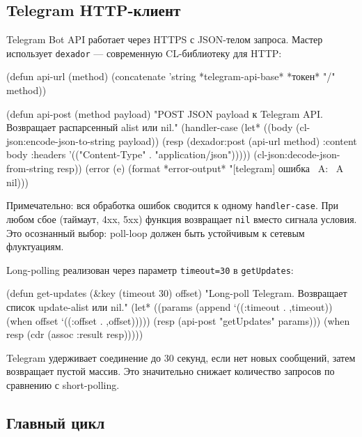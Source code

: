 \documentclass[11pt,a4paper]{article}
\begin{document}
\subsection{Telegram HTTP-клиент}

Telegram Bot API работает через HTTPS с JSON-телом запроса. Мастер использует \texttt{dexador} — современную CL-библиотеку для HTTP:

\begin{lispcode}[caption={мастер/cl/telegram.lisp — ядро HTTP-клиента}]
(defun api-url (method)
  (concatenate 'string *telegram-api-base* *токен* "/" method))

(defun api-post (method payload)
  "POST JSON payload к Telegram API.
  Возвращает распарсенный alist или nil."
  (handler-case
      (let* ((body (cl-json:encode-json-to-string payload))
             (resp (dexador:post (api-url method)
                                 :content body
                                 :headers '(("Content-Type"
                                             . "application/json")))))
        (cl-json:decode-json-from-string resp))
    (error (e)
      (format *error-output* "[telegram] ошибка ~A: ~A~%
      nil)))
\end{lispcode}

Примечательно: вся обработка ошибок сводится к одному \texttt{handler-case}. При любом сбое (таймаут, 4xx, 5xx) функция возвращает \texttt{nil} вместо сигнала условия. Это осознанный выбор: poll-loop должен быть устойчивым к сетевым флуктуациям.

Long-polling реализован через параметр \texttt{timeout=30} в \texttt{getUpdates}:

\begin{lispcode}[caption={мастер/cl/telegram.lisp — long-poll}]
(defun get-updates (&key (timeout 30) offset)
  "Long-poll Telegram. Возвращает список update-alist или nil."
  (let* ((params (append `((:timeout . ,timeout))
                         (when offset `((:offset . ,offset)))))
         (resp (api-post "getUpdates" params)))
    (when resp (cdr (assoc :result resp)))))
\end{lispcode}

Telegram удерживает соединение до 30 секунд, если нет новых сообщений, затем возвращает пустой массив. Это значительно снижает количество запросов по сравнению с short-polling.

\subsection{Главный цикл}
\end{document}
